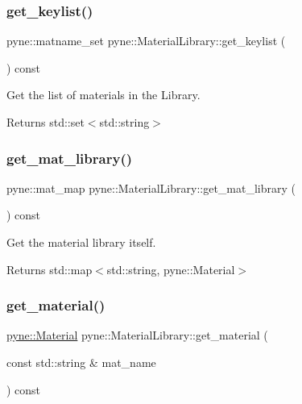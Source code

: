 \subsubsection{\texorpdfstring{get\+\_\+keylist()}{get\_keylist()}}
{\footnotesize\ttfamily pyne\+::matname\+\_\+set pyne\+::\+Material\+Library\+::get\+\_\+keylist (\begin{DoxyParamCaption}{ }\end{DoxyParamCaption}) const\hspace{0.3cm}{\ttfamily [inline]}}



Get the list of materials in the Library. 

\begin{DoxyReturn}{Returns}
std\+::set$<$std\+::string$>$ 
\end{DoxyReturn}
\mbox{\label{classpyne_1_1_material_library_aac74b654cf331fada9b8030098c9f3ea}} 
\subsubsection{\texorpdfstring{get\+\_\+mat\+\_\+library()}{get\_mat\_library()}}
{\footnotesize\ttfamily pyne\+::mat\+\_\+map pyne\+::\+Material\+Library\+::get\+\_\+mat\+\_\+library (\begin{DoxyParamCaption}{ }\end{DoxyParamCaption}) const\hspace{0.3cm}{\ttfamily [inline]}}



Get the material library itself. 

\begin{DoxyReturn}{Returns}
std\+::map$<$std\+::string, pyne\+::\+Material$>$ 
\end{DoxyReturn}
\mbox{\label{classpyne_1_1_material_library_a7f4a9f6b1122433bd2191cb54fc27e30}} 
\subsubsection{\texorpdfstring{get\+\_\+material()}{get\_material()}}
{\footnotesize\ttfamily \hyperlink{classpyne_1_1_material}{pyne\+::\+Material} pyne\+::\+Material\+Library\+::get\+\_\+material (\begin{DoxyParamCaption}\item[{const std\+::string \&}]{mat\+\_\+name }\end{DoxyParamCaption}) const}



